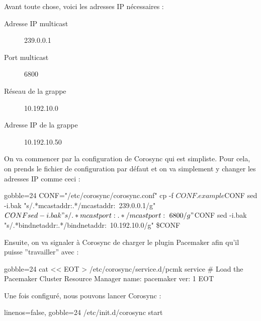 \documentclass[11pt,a4paper]{report}
\begin{document}
                    Avant toute chose, voici les adresses IP nécessaires :\\

                    \begin{description}
                        \item[Adresse IP multicast] 239.0.0.1
                        \item[Port multicast] 6800
                        \item[Réseau de la grappe] 10.192.10.0
                        \item[Adresse IP de la grappe] 10.192.10.50
                    \end{description}

                    On va commencer par la configuration de Corosync qui est simpliste. Pour cela, on prends le fichier de configuration par défaut et on va simplement y changer les adresses IP comme ceci :\\

                    \begin{bashcode*}{gobble=24}
                        CONF="/etc/corosync/corosync.conf"
                        cp -f $CONF.example $CONF
                        sed -i.bak "s/.*mcastaddr:.*/mcastaddr:\ 239.0.0.1/g" $CONF
                        sed -i.bak "s/.*mcastport:.*/mcastport:\ 6800/g" $CONF
                        sed -i.bak "s/.*bindnetaddr:.*/bindnetaddr:\ 10.192.10.0/g" \$CONF
                    \end{bashcode*}

                    Ensuite, on va signaler à Corosync de charger le plugin Pacemaker afin qu'il puisse ''travailler'' avec :\\

                    \begin{bashcode*}{gobble=24}
                        cat << EOT > /etc/corosync/service.d/pcmk
                        service {
                                # Load the Pacemaker Cluster Resource Manager
                                name: pacemaker
                                ver:  1
                        }
                        EOT
                    \end{bashcode*}

                    Une fois configuré, nous pouvons lancer Corosync :\\

                    \begin{bashcode*}{linenos=false, gobble=24}
                        /etc/init.d/corosync start
                    \end{bashcode*}
                
\end{document}

